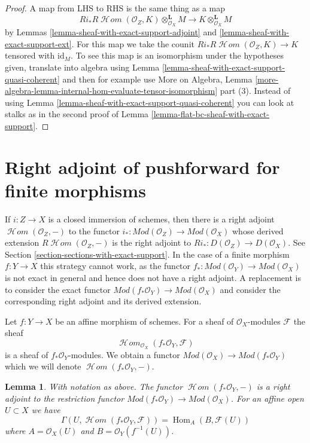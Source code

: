 \documentclass{stacks-project}
\theoremstyle{plain}
\newtheorem{lemma}[subsection]{Lemma}
\theoremstyle{definition}
\theoremstyle{remark}
\numberwithin{equation}{subsection}
\def\Hom{\mathop{\mathrm{Hom}}\nolimits}
\def\SheafHom{\mathop{\mathcal{H}\!\mathit{om}}\nolimits}
\begin{document}
\begin{proof}
A map from LHS to RHS is the same thing as a map
$$
Ri_*R\SheafHom(\mathcal{O}_Z, K) \otimes_{\mathcal{O}_X}^\mathbf{L} M
\longrightarrow
K \otimes_{\mathcal{O}_X}^\mathbf{L} M
$$
by Lemmas \ref{lemma-sheaf-with-exact-support-adjoint} and
\ref{lemma-sheaf-with-exact-support-ext}. For this map we take the
counit $Ri_*R\SheafHom(\mathcal{O}_Z, K) \to K$ tensored with $\text{id}_M$.
To see this map is an isomorphism under the hypotheses given,
translate into algebra using
Lemma \ref{lemma-sheaf-with-exact-support-quasi-coherent}
and then for example use More on Algebra, Lemma
\ref{more-algebra-lemma-internal-hom-evaluate-tensor-isomorphism} part (3).
Instead of using Lemma \ref{lemma-sheaf-with-exact-support-quasi-coherent}
you can look at stalks as in the second proof of
Lemma \ref{lemma-flat-bc-sheaf-with-exact-support}.
\end{proof}



\section{Right adjoint of pushforward for finite morphisms}
\label{section-duality-finite}

\noindent
If $i : Z \to X$ is a closed immersion of schemes, then there is
a right adjoint $\SheafHom(\mathcal{O}_Z, -)$ to the functor
$i_* : \textit{Mod}(\mathcal{O}_Z) \to \textit{Mod}(\mathcal{O}_X)$
whose derived extension $R\SheafHom(\mathcal{O}_Z, -)$
is the right adjoint to $Ri_* : D(\mathcal{O}_Z) \to D(\mathcal{O}_X)$. See
Section \ref{section-sections-with-exact-support}.
In the case of a finite morphism $f : Y \to X$ this strategy
cannot work, as the functor
$f_* : \textit{Mod}(\mathcal{O}_Y) \to \textit{Mod}(\mathcal{O}_X)$
is not exact in general and hence does not have a right adjoint.
A replacement is to consider the exact functor
$\textit{Mod}(f_*\mathcal{O}_Y) \to \textit{Mod}(\mathcal{O}_X)$
and consider the corresponding right adjoint and its derived
extension.

\medskip\noindent
Let $f : Y \to X$ be an affine morphism of schemes. For a sheaf
of $\mathcal{O}_X$-modules $\mathcal{F}$ the sheaf
$$
\SheafHom_{\mathcal{O}_X}(f_*\mathcal{O}_Y, \mathcal{F})
$$
is a sheaf of $f_*\mathcal{O}_Y$-modules. We obtain a functor
$\textit{Mod}(\mathcal{O}_X) \to \textit{Mod}(f_*\mathcal{O}_Y)$
which we will denote $\SheafHom(f_*\mathcal{O}_Y, -)$.

\begin{lemma}
\label{lemma-compute-sheafhom-affine}
With notation as above. The functor $\SheafHom(f_*\mathcal{O}_Y, -)$ is a
right adjoint to the restriction functor
$\textit{Mod}(f_*\mathcal{O}_Y) \to \textit{Mod}(\mathcal{O}_X)$.
For an affine open $U \subset X$ we have
$$
\Gamma(U, \SheafHom(f_*\mathcal{O}_Y, \mathcal{F})) =
\Hom_A(B, \mathcal{F}(U))
$$
where $A = \mathcal{O}_X(U)$ and $B = \mathcal{O}_Y(f^{-1}(U))$.
\end{lemma}
\end{document}
